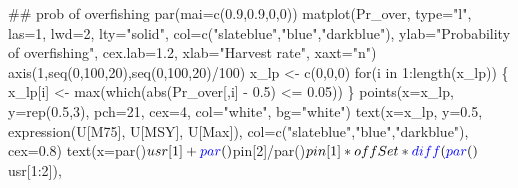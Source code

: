 \documentclass[
  11pt,
]{article}
\newenvironment{Shaded}{}{}
\newcommand{\CommentTok}[1]{\textcolor[rgb]{0.00,0.50,0.00}{#1}}
\newcommand{\ControlFlowTok}[1]{\textcolor[rgb]{0.00,0.00,1.00}{#1}}
\newcommand{\DataTypeTok}[1]{#1}
\newcommand{\DecValTok}[1]{#1}
\newcommand{\FloatTok}[1]{#1}
\newcommand{\KeywordTok}[1]{\textcolor[rgb]{0.00,0.00,1.00}{#1}}
\newcommand{\NormalTok}[1]{#1}
\newcommand{\OperatorTok}[1]{#1}
\newcommand{\StringTok}[1]{\textcolor[rgb]{0.00,0.50,0.50}{#1}}
\begin{document}
\begin{Shaded}
\begin{Highlighting}[]
{{\CommentTok{## prob of overfishing}
\KeywordTok{par}\NormalTok{(}\DataTypeTok{mai=}\KeywordTok{c}\NormalTok{(}\FloatTok{0.9}\NormalTok{,}\FloatTok{0.9}\NormalTok{,}\DecValTok{0}\NormalTok{,}\DecValTok{0}\NormalTok{))}
\KeywordTok{matplot}\NormalTok{(Pr_over, }\DataTypeTok{type=}\StringTok{"l"}\NormalTok{, }\DataTypeTok{las=}\DecValTok{1}\NormalTok{, }\DataTypeTok{lwd=}\DecValTok{2}\NormalTok{, }\DataTypeTok{lty=}\StringTok{"solid"}\NormalTok{, }\DataTypeTok{col=}\KeywordTok{c}\NormalTok{(}\StringTok{"slateblue"}\NormalTok{,}\StringTok{"blue"}\NormalTok{,}\StringTok{"darkblue"}\NormalTok{),}
        \DataTypeTok{ylab=}\StringTok{"Probability of overfishing"}\NormalTok{, }\DataTypeTok{cex.lab=}\FloatTok{1.2}\NormalTok{,}
        \DataTypeTok{xlab=}\StringTok{"Harvest rate"}\NormalTok{, }\DataTypeTok{xaxt=}\StringTok{"n"}\NormalTok{)}
\KeywordTok{axis}\NormalTok{(}\DecValTok{1}\NormalTok{,}\KeywordTok{seq}\NormalTok{(}\DecValTok{0}\NormalTok{,}\DecValTok{100}\NormalTok{,}\DecValTok{20}\NormalTok{),}\KeywordTok{seq}\NormalTok{(}\DecValTok{0}\NormalTok{,}\DecValTok{100}\NormalTok{,}\DecValTok{20}\NormalTok{)}\OperatorTok{/}\DecValTok{100}\NormalTok{)}
\NormalTok{x_lp <-}\StringTok{ }\KeywordTok{c}\NormalTok{(}\DecValTok{0}\NormalTok{,}\DecValTok{0}\NormalTok{,}\DecValTok{0}\NormalTok{)}
\ControlFlowTok{for}\NormalTok{(i }\ControlFlowTok{in} \DecValTok{1}\OperatorTok{:}\KeywordTok{length}\NormalTok{(x_lp)) \{}
\NormalTok{  x_lp[i] <-}\StringTok{ }\KeywordTok{max}\NormalTok{(}\KeywordTok{which}\NormalTok{(}\KeywordTok{abs}\NormalTok{(Pr_over[,i] }\OperatorTok{-}\StringTok{ }\FloatTok{0.5}\NormalTok{) }\OperatorTok{<=}\StringTok{ }\FloatTok{0.05}\NormalTok{))}
\NormalTok{\}}
\KeywordTok{points}\NormalTok{(}\DataTypeTok{x=}\NormalTok{x_lp, }\DataTypeTok{y=}\KeywordTok{rep}\NormalTok{(}\FloatTok{0.5}\NormalTok{,}\DecValTok{3}\NormalTok{), }\DataTypeTok{pch=}\DecValTok{21}\NormalTok{, }\DataTypeTok{cex=}\DecValTok{4}\NormalTok{, }\DataTypeTok{col=}\StringTok{"white"}\NormalTok{, }\DataTypeTok{bg=}\StringTok{"white"}\NormalTok{)}
\KeywordTok{text}\NormalTok{(}\DataTypeTok{x=}\NormalTok{x_lp, }\DataTypeTok{y=}\FloatTok{0.5}\NormalTok{, }\KeywordTok{expression}\NormalTok{(U[M75], U[MSY], U[Max]),}
     \DataTypeTok{col=}\KeywordTok{c}\NormalTok{(}\StringTok{"slateblue"}\NormalTok{,}\StringTok{"blue"}\NormalTok{,}\StringTok{"darkblue"}\NormalTok{), }\DataTypeTok{cex=}\FloatTok{0.8}\NormalTok{)}
\KeywordTok{text}\NormalTok{(}\DataTypeTok{x=}\KeywordTok{par}\NormalTok{()}\OperatorTok{$}\NormalTok{usr[}\DecValTok{1}\NormalTok{]}\OperatorTok{+}\KeywordTok{par}\NormalTok{()}\OperatorTok{$}\NormalTok{pin[}\DecValTok{2}\NormalTok{]}\OperatorTok{/}\KeywordTok{par}\NormalTok{()}\OperatorTok{$}\NormalTok{pin[}\DecValTok{1}\NormalTok{]}\OperatorTok{*}\NormalTok{offSet}\OperatorTok{*}\KeywordTok{diff}\NormalTok{(}\KeywordTok{par}\NormalTok{()}\OperatorTok{$}\NormalTok{usr[}\DecValTok{1}\OperatorTok{:}\DecValTok{2}\NormalTok{]),}
}}
\end{Highlighting}
\end{Shaded}
\end{document}
